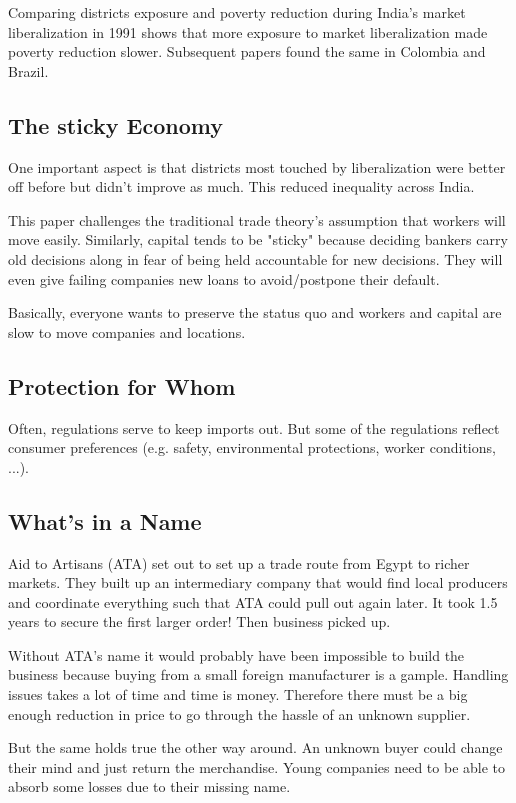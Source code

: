 \documentclass[a4paper, twocolumn]{article}
\begin{document}
Comparing districts exposure and poverty reduction during India's market liberalization in 1991 \cite{immobility-regional-impacts} shows that more exposure to market liberalization made poverty reduction slower. Subsequent papers found the same in Colombia and Brazil.

\subsection{The sticky Economy}
One important aspect is that districts most touched by liberalization were better off before but didn't improve as much. This reduced inequality across India.

This paper challenges the traditional trade theory's assumption that workers will move easily. Similarly, capital tends to be "sticky" because deciding bankers carry old decisions along in fear of being held accountable for new decisions. They will even give failing companies new loans to avoid/postpone their default.

Basically, everyone wants to preserve the status quo and workers and capital are slow to move companies and locations.

\subsection{Protection for Whom}
Often, regulations serve to keep imports out. But some of the regulations reflect consumer preferences (e.g. safety, environmental protections, worker conditions, ...). 

\subsection{What's in a Name}
Aid to Artisans (ATA) set out to set up a trade route from Egypt to richer markets. They built up an intermediary company that would find local producers and coordinate everything such that ATA could pull out again later. It took 1.5 years to secure the first larger order! Then business picked up.

Without ATA's name it would probably have been impossible to build the business because buying from a small foreign manufacturer is a gample. Handling issues takes a lot of time and time is money. Therefore there must be a big enough reduction in price to go through the hassle of an unknown supplier.

But the same holds true the other way around. An unknown buyer could change their mind and just return the merchandise. Young companies need to be able to absorb some losses due to their missing name.
\end{document}
